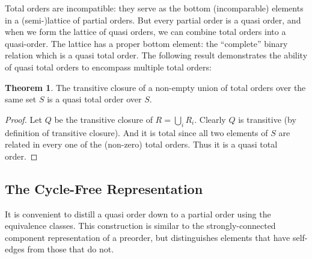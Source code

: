 \documentclass[12pt]{article}
\theoremstyle{definition}
\theoremstyle{theorem}
\newtheorem{theorem}{Theorem}[section]
\begin{document}
Total orders are incompatible: they serve as the bottom (incomparable)
elements in a (semi-)lattice of partial orders.  But every partial order is a
quasi order, and when we form the lattice of quasi orders, we can
combine total orders into a quasi-order.  The lattice has a proper
bottom element: the ``complete'' binary relation which is a quasi
total order.  The following result demonstrates the ability of quasi
total orders to encompass multiple total orders:

\begin{theorem}
  The transitive closure of a non-empty union of total orders over the
  same set $S$ is a
  quasi total order over $S$.
\end{theorem}
\begin{proof}
  Let \( Q \) be the transitive closure of \(R = \bigcup_i R_i\).  Clearly
  $Q$ is transitive (by definition of transitive closure).  And it is
  total since all two elements of $S$ are related in every one of the
  (non-zero) total orders.  Thus it is a quasi total order.
\end{proof}

\subsection{The Cycle-Free Representation}

It is convenient to distill a quasi order down to a partial order
using the equivalence classes.  This construction is similar to the
strongly-connected component representation of a preorder, but
distinguishes elements that have self-edges from those that do not.
\end{document}
